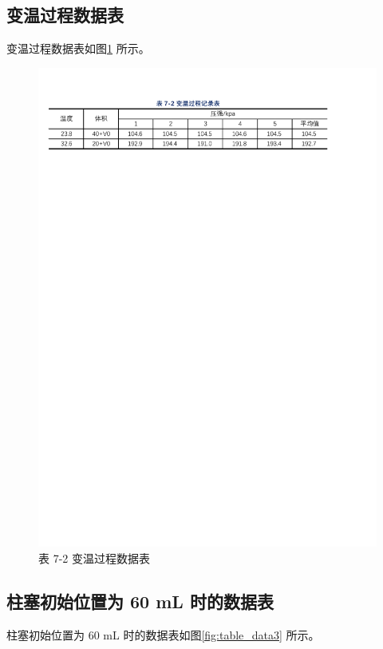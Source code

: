 \documentclass[12pt]{article}
\begin{document}
\subsection{\normalfont 变温过程数据表}

变温过程数据表如图\ref{fig:table_data2} 所示。

\begin{figure}[H] %
    \centering
    \includegraphics[width=\textwidth]{./figures/T7-2.pdf} 
    \caption{表 7-2 变温过程数据表}
    \label{fig:table_data2}
\end{figure}

\subsection{\normalfont 柱塞初始位置为 60 mL 时的数据表}

柱塞初始位置为 60 mL 时的数据表如图\ref{fig:table_data3} 所示。
\end{document}
